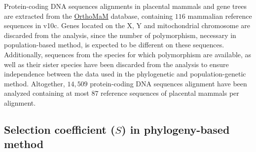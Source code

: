 \documentclass{article}
\newcommand{\Sphy}{S}
\begin{document}
    Protein-coding DNA sequences alignments in placental mammals and gene trees are extracted from the \href{https://www.orthomam.univ-montp2.fr}{OrthoMaM} database, containing $116$ mammalian reference sequences in v10c\cite{ranwez_orthomam_2007, douzery_orthomam_2014, scornavacca_orthomam_2019}.
    Genes located on the X, Y and mitochondrial chromosome are discarded from the analysis, since the number of polymorphism, necessary in population-based method, is expected to be different on these sequences.
    Additionally, sequences from the species for which polymorphism are available, as well as their sister species have been discarded from the analysis to ensure independence between the data used in the phylogenetic and population-genetic method.
    Altogether, $14,509$ protein-coding DNA sequences alignment have been analyzed containing at most $87$ reference sequences of placental mammals per alignment.

    \subsection{Selection coefficient ($\Sphy$) in phylogeny-based method}
    \label{subsec:s-phylogeny-method}
\end{document}
